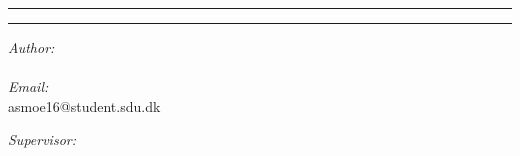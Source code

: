 \documentclass[../main.tex]{subfiles}
\begin{document}
\makeatletter
\begin{titlepage}
	\vspace{3cm}
	\hrule
	\begin{center}
		{\bf\Huge\@title}
	\end{center}
	\hrule
	\begin{multicols}{2}
	\begin{flushleft}
		\textit{Author:} \\
		\@author\\
		\vspace{10pt}
		\textit{Email:} \\
		asmoe16@student.sdu.dk

	\end{flushleft}
	\columnbreak
	\begin{flushright}
		\textit{Supervisor:} \\
		\supervisor
	\end{flushright}
\end{multicols}




\end{titlepage}
\end{document}
